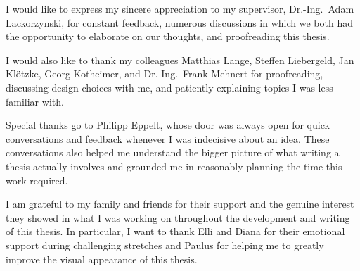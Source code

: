 \label{sec:acknowledgments}

I would like to express my sincere appreciation to my supervisor, Dr.-Ing.\ Adam Lackorzynski, for constant feedback, numerous discussions in which we both had the opportunity to elaborate on our thoughts, and proofreading this thesis.

I would also like to thank my colleagues Matthias Lange, Steffen Liebergeld, Jan Klötzke, Georg Kotheimer, and Dr.-Ing.\ Frank Mehnert for proofreading, discussing design choices with me, and patiently explaining topics I was less familiar with.

Special thanks go to Philipp Eppelt, whose door was always open for quick conversations and feedback whenever I was indecisive about an idea.
These conversations also helped me understand the bigger picture of what writing a thesis actually involves and grounded me in reasonably planning the time this work required.

I am grateful to my family and friends for their support and the genuine interest they showed in what I was working on throughout the development and writing of this thesis.
In particular, I want to thank Elli and Diana for their emotional support during challenging stretches and Paulus for helping me to greatly improve the visual appearance of this thesis.

\cleardoublepage

